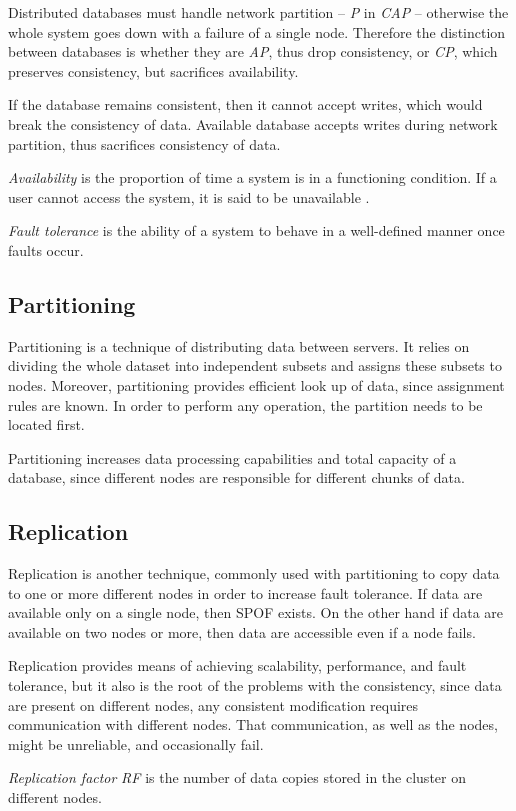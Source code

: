 Distributed databases must handle network partition -- \emph{P} in \emph{CAP} -- otherwise the whole system goes down with a failure of a single node. Therefore the distinction between databases is whether they are \emph{AP}, thus drop consistency, or \emph{CP}, which preserves consistency, but sacrifices availability.

If the database remains consistent, then it cannot accept writes, which would break the consistency of data. Available database accepts writes during network partition, thus sacrifices consistency of data.

\begin{definition}
	\label{def:availability}
	\emph{Availability} is the proportion of time a system is in a functioning condition. If a user cannot access the system, it is said to be unavailable \cite{DistributeSystemsForFunAndProfit}.	
\end{definition}


\begin{definition}
\label{def:fault-tolerance}
\emph{Fault tolerance} is the ability of a system to behave in a well-defined manner once faults occur. 
\end{definition}

\subsection{Partitioning}
Partitioning is a technique of distributing data between servers. 
It relies on dividing the whole dataset into independent subsets and assigns these subsets to nodes. 
Moreover, partitioning provides efficient look up of data, since assignment rules are known. In order to perform any operation, the partition needs to be located first. 

Partitioning increases data processing capabilities and total capacity of a database, since different nodes are responsible for different chunks of data. 

\subsection{Replication}
Replication is another technique, commonly used with partitioning to copy data to one or more different nodes in order to increase fault tolerance. If data are available only on a single node, then SPOF exists. On the other hand if data are available on two nodes or more, then data are accessible even if a node fails. 

Replication provides means of achieving scalability, performance, and fault tolerance, but it also is the root of the problems with the consistency, since data are present on different nodes, any consistent modification requires communication with different nodes. That communication, as well as the nodes, might be unreliable, and occasionally fail. 

\begin{definition}
  \label{def:replicationFactor}
  \emph{Replication factor} \emph{RF} is the number of data copies stored in the cluster on different nodes.
\end{definition}

